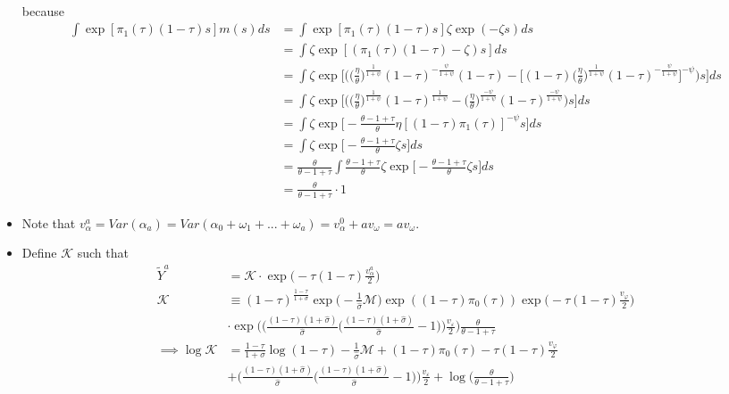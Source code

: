 \documentclass{article}
\newcommand{\M}{\mathcal{M}}
\begin{document}
\begin{itemize}
\begin{align*}
\end{align*}
because
\begin{align*}
\int \exp[  \pi_1(\tau)  (1-\tau)s ] m(s)ds 
&= \int \exp[  \pi_1(\tau)  (1-\tau)s ] \zeta \exp(-\zeta s) ds \\
&= \int \zeta \exp[(\pi_1(\tau)  (1-\tau)-\zeta) s] ds \\
&= \int \zeta \exp\Bigg[\Bigg(\Bigg( \frac{\eta}{\theta} \Bigg)^{\frac{1}{1+\psi}}(1-\tau)^{-\frac{\psi}{1+\psi}}  (1-\tau)-\Big[(1-\tau)\Bigg( \frac{\eta}{\theta} \Bigg)^{\frac{1}{1+\psi}}(1-\tau)^{-\frac{\psi}{1+\psi}}\Big]^{-\psi}\Bigg) s\Bigg] ds \\
&= \int \zeta \exp\Bigg[\Bigg(\Bigg( \frac{\eta}{\theta} \Bigg)^{\frac{1}{1+\psi}}(1-\tau)^{\frac{1}{1+\psi}}  -\Bigg( \frac{\eta}{\theta} \Bigg)^{\frac{-\psi}{1+\psi}}(1-\tau)^{\frac{ - \psi}{1+\psi}}\Bigg) s\Bigg] ds \\
&= \int \zeta \exp\Bigg[- \frac{\theta - 1 + \tau}{\theta}\eta[(1-\tau)\pi_1(\tau)]^{-\psi} s\Bigg] ds \\
&= \int \zeta \exp\Bigg[- \frac{\theta - 1 + \tau}{\theta}\zeta s\Bigg] ds \\
&= \frac{\theta}{\theta - 1 + \tau} \int \frac{\theta - 1 + \tau}{\theta}\zeta \exp\Bigg[- \frac{\theta - 1 + \tau}{\theta}\zeta s\Bigg] ds \\
&= \frac{\theta}{\theta - 1 + \tau} \cdot 1
\end{align*}
\item Note that $v_\alpha^a = Var(\alpha_a) = Var(\alpha_0 + \omega_{1} + ... +\omega_{a}) = v_\alpha^0 + a v_\omega = a v_\omega$. 
\item Define $\mathcal{K}$ such that
\begin{align*}
\tilde Y^a &= \mathcal{K} \cdot \exp \Big(-\tau(1-\tau)\frac{v_\alpha^a}{2}\Big)\\
\mathcal{K}  &\equiv  (1-\tau)^{\frac{1-\tau}{1+\sigma}} \exp\Big(-\frac{1}{\hat\sigma} \M\Big)\exp((1-\tau)\pi_0(\tau))
\exp\Big(-\tau(1-\tau)\frac{v_\varphi}{2}\Big) \\
& \cdot \exp\Big( \Big( \frac{(1-\tau)(1+\hat\sigma)}{\hat \sigma}\Big(\frac{(1-\tau)(1+\hat\sigma)}{\hat \sigma} - 1 \Big)\Big) \frac{v_\varepsilon}{2} \Big)  \frac{\theta}{\theta - 1 + \tau}\\
\implies
\log \mathcal{K} &=  \frac{1-\tau}{1+\sigma} \log(1-\tau) -\frac{1}{\hat\sigma} \M + (1-\tau)\pi_0(\tau) -\tau(1-\tau)\frac{v_\varphi}{2} \\
& + \Big( \frac{(1-\tau)(1+\hat\sigma)}{\hat \sigma}\Big(\frac{(1-\tau)(1+\hat\sigma)}{\hat \sigma} - 1 \Big)\Big) \frac{v_\varepsilon}{2} + \log\Bigg(  \frac{\theta}{\theta - 1 + \tau}\Bigg)

\end{align*}
\end{itemize}
\end{document}
